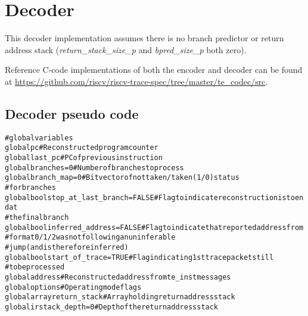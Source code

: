 \chapter{Decoder}

This decoder implementation assumes there is no branch predictor or return address 
stack (\textit{return\_stack\_size\_p} and \textit{bpred\_size\_p} both zero).

Reference C-code implementations of both the encoder and decoder can be found at 
\href{https://github.com/riscv/riscv-trace-spec/tree/master/te_codec/src}{https://github.com/riscv/riscv-trace-spec/tree/master/te\_codec/src}.

\section{Decoder pseudo code}

\begin{alltt}
# global variables
global       pc                          # Reconstructed program counter
global       last_pc                     # PC of previous instruction
global       branches = 0                # Number of branches to process
global       branch_map = 0              # Bit vector of not taken/taken (1/0) status
                                         #   for branches
global bool  stop_at_last_branch = FALSE # Flag to indicate reconstruction is to end at
                                         #   the final branch
global bool  inferred_address = FALSE    # Flag to indicate that reported address from
                                         #   format 0/1/2 was not following an uninferable
                                         #   jump (and is therefore inferred)
global bool  start_of_trace = TRUE       # Flag indicating 1st trace packet still
                                         #   to be processed
global       address                     # Reconstructed address from te_inst messages
global       options                     # Operating mode flags
global array return_stack                # Array holding return address stack
global       irstack_depth = 0           # Depth of the return address stack
\end{alltt}

\pagebreak

